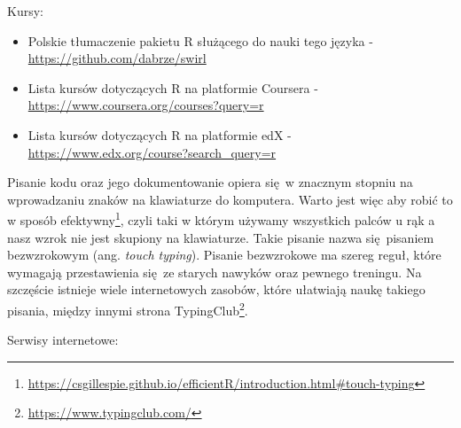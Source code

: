 \documentclass[paper=6in:9in,pagesize=pdftex,headinclude=on,footinclude=on,10pt]{scrbook}
\makeatletter
\DeclareRobustCommand{\href}[2]{#2\footnote{\url{#1}}}
\providecommand{\tightlist}{%
  \setlength{\itemsep}{0pt}\setlength{\parskip}{0pt}}
\newenvironment{kframe}{%
\medskip{}
\setlength{\fboxsep}{.8em}
 \def\at@end@of@kframe{}%
 \ifinner\ifhmode%
  \def\at@end@of@kframe{\end{minipage}}%
  \begin{minipage}{\columnwidth}%
 \fi\fi%
 \def\FrameCommand##1{\hskip\@totalleftmargin \hskip-\fboxsep
 \colorbox{shadecolor}{##1}\hskip-\fboxsep
     \hskip-\linewidth \hskip-\@totalleftmargin \hskip\columnwidth}%
 \MakeFramed {\advance\hsize-\width
   \@totalleftmargin\z@ \linewidth\hsize
   \@setminipage}}%
 {\par\unskip\endMakeFramed%
 \at@end@of@kframe}
\newenvironment{rmdblock}[1]
  {
  \begin{itemize}
  \renewcommand{\labelitemi}{
    \raisebox{-.7\height}[0pt][0pt]{
      {\setkeys{Gin}{width=3em,keepaspectratio}\texttt{[image: images/\#1]}}
    }
  }
  \setlength{\fboxsep}{1em}
  \begin{kframe}
  \item
  }
  {
  \end{kframe}
  \end{itemize}
  }
\newenvironment{rmdinfo}
  {\begin{rmdblock}{compass}}
  {\end{rmdblock}}
\makeatother
\begin{document}
Kursy:

\begin{itemize}
\tightlist
\item
  Polskie tłumaczenie pakietu R służącego do nauki tego języka - \url{https://github.com/dabrze/swirl}
\item
  Lista kursów dotyczących R na platformie Coursera - \url{https://www.coursera.org/courses?query=r}
\item
  Lista kursów dotyczących R na platformie edX - \url{https://www.edx.org/course?search_query=r}
\end{itemize}

\begin{rmdinfo}
Pisanie kodu oraz jego dokumentowanie opiera się~w znacznym stopniu na wprowadzaniu znaków na klawiaturze do komputera.
Warto jest więc aby robić to w sposób \href{https://csgillespie.github.io/efficientR/introduction.html\#touch-typing}{efektywny}, czyli taki w którym używamy wszystkich palców u rąk a nasz wzrok nie jest skupiony na klawiaturze.
Takie pisanie nazwa się~pisaniem bezwzrokowym (ang. \emph{touch typing}).
Pisanie bezwzrokowe ma szereg reguł, które wymagają przestawienia się~ze starych nawyków oraz pewnego treningu.
Na szczęście istnieje wiele internetowych zasobów, które ułatwiają naukę takiego pisania, między innymi strona \href{https://www.typingclub.com/}{TypingClub}.
\end{rmdinfo}

Serwisy internetowe:
\end{document}
